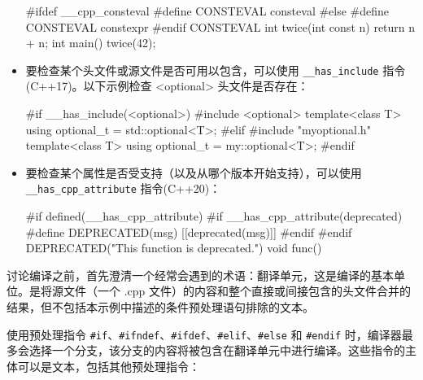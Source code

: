 \begin{itemize}
\begin{cpp}
#ifdef __cpp_consteval
#define CONSTEVAL consteval
#else
#define CONSTEVAL constexpr
#endif
CONSTEVAL int twice(int const n)
{
    return n + n;
}
int main()
{
    twice(42);
}
\end{cpp}

\item
要检查某个头文件或源文件是否可用以包含，可以使用 \verb|__has_include| 指令(C++17)。以下示例检查 <optional> 头文件是否存在：

\begin{cpp}
#if __has_include(<optional>)
#include <optional>
template<class T> using optional_t = std::optional<T>;
#elif
#include "myoptional.h"
template<class T> using optional_t = my::optional<T>;
#endif
\end{cpp}

\item
要检查某个属性是否受支持（以及从哪个版本开始支持），可以使用 \verb|__has_cpp_attribute| 指令(C++20)：

\begin{cpp}
#if defined(__has_cpp_attribute)
#if __has_cpp_attribute(deprecated)
#define DEPRECATED(msg) [[deprecated(msg)]]
#endif
#endif
DEPRECATED("This function is deprecated.")
void func() {}
\end{cpp}
\end{itemize}


讨论编译之前，首先澄清一个经常会遇到的术语：翻译单元，这是编译的基本单位。是将源文件（一个 .cpp 文件）的内容和整个直接或间接包含的头文件合并的结果，但不包括本示例中描述的条件预处理语句排除的文本。

使用预处理指令 \verb|#if|、\verb|#ifndef|、\verb|#ifdef|、\verb|#elif|、\verb|#else| 和 \verb|#endif| 时，编译器最多会选择一个分支，该分支的内容将被包含在翻译单元中进行编译。这些指令的主体可以是文本，包括其他预处理指令：

